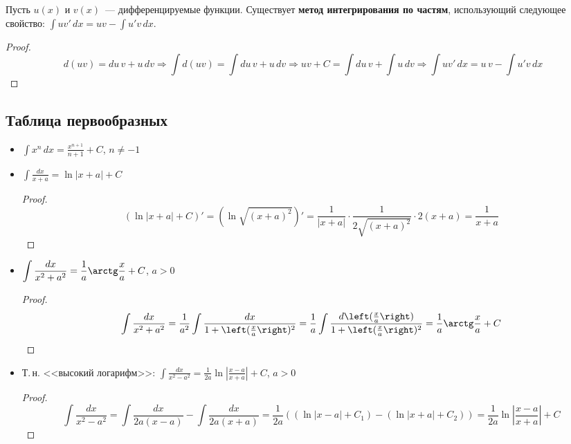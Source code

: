 Пусть $u(x)$ и $v(x)$~--- дифференцируемые функции.
 Существует \textbf{метод интегрирования по частям}, использующий следующее свойство:
$\int uv'\,dx = uv - \int u'v\,dx$.
\begin{proof}
\begin{equation*}
d(uv) = du\,v + u\,dv \Rightarrow
\int d(uv) = \int du\,v + u\,dv \Rightarrow
uv + C = \int du\,v + \int u\,dv \Rightarrow
\int uv'\,dx = u\,v - \int u'v\,dx
\end{equation*}
\end{proof}

\subsection{Таблица первообразных}
\begin{itemize}
	\item $\displaystyle \int x^n\,dx = \frac{x^{n+1}}{n + 1} + C$, $n \neq -1$
	
	\item $\displaystyle \int \frac{dx}{x + a} = \ln |x + a| + C$
	\begin{proof}
	\begin{equation*}
	(\ln |x + a| + C)' = (\ln \sqrt{(x + a)^2})' = \frac1{|x + a|} \cdot \frac1{2\sqrt{(x + a)^2}} \cdot 2(x + a) = \frac1{x + a}
	\end{equation*}
	\end{proof}
	
	\item $\displaystyle \int \frac{dx}{x^2 + a^2} = \frac1a \arctg \frac{x}a + C$, $a > 0$
	\begin{proof}
	\begin{equation*}
	\int \frac{dx}{x^2 + a^2} =
	\frac1{a^2} \int \frac{dx}{1 + \left( \frac{x}a \right)^2} =
	\frac1a \int \frac{d \left( \frac{x}a \right)}{1 + \left( \frac{x}a \right)^2} =
	\frac1a \arctg \frac{x}a + C
	\end{equation*}
	\end{proof}
	
	\item Т.\,н. <<высокий логарифм>>: $\displaystyle \int \frac{dx}{x^2 - a^2} = \frac1{2a} \ln \left| \frac{x - a}{x + a} \right| + C$, $a > 0$
	\begin{proof}
	\begin{equation*}
	\int \frac{dx}{x^2 - a^2} =
	\int \frac{dx}{2a(x - a)} - \int \frac{dx}{2a(x + a)} =
	\frac1{2a} ((\ln |x - a| + C_1) - (\ln |x + a| + C_2)) =
	\frac1{2a} \ln \left| \frac{x - a}{x + a} \right| + C
	\end{equation*}
	\end{proof}
	

\end{itemize}
